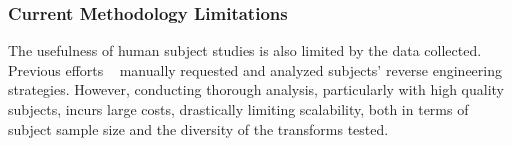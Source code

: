 \subsubsection{Current Methodology Limitations}


The usefulness of human subject studies is also  limited by the data collected. Previous efforts ~\cite{ceccato2017professional, tigress} manually requested and analyzed subjects' reverse engineering strategies. However, conducting thorough analysis, particularly with high quality subjects, incurs large costs, drastically limiting scalability, both in terms of subject sample size and the diversity of the transforms tested.

